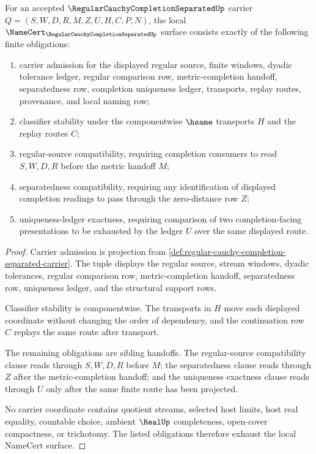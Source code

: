 \begin{theorem}
\label{thm:regular-cauchy-completion-separated-namecert-obligations}
For an accepted $\RegularCauchyCompletionSeparatedUp$ carrier $Q=(S,W,D,R,M,Z,U,H,C,P,N)$, the local $\NameCert_{\RegularCauchyCompletionSeparatedUp}$ surface consists exactly of the following finite obligations:
\begin{enumerate}
\item carrier admission for the displayed regular source, finite windows, dyadic tolerance ledger, regular comparison row, metric-completion handoff, separatedness row, completion uniqueness ledger, transports, replay routes, provenance, and local naming row;
\item classifier stability under the componentwise $\hsame$ transports $H$ and the replay routes $C$;
\item regular-source compatibility, requiring completion consumers to read $S,W,D,R$ before the metric handoff $M$;
\item separatedness compatibility, requiring any identification of displayed completion readings to pass through the zero-distance row $Z$;
\item uniqueness-ledger exactness, requiring comparison of two completion-facing presentations to be exhausted by the ledger $U$ over the same displayed route.
\end{enumerate}
\end{theorem}
\begin{proof}
Carrier admission is projection from \autoref{def:regular-cauchy-completion-separated-carrier}. The tuple displays the regular source, stream windows, dyadic tolerances, regular comparison row, metric-completion handoff, separatedness row, uniqueness ledger, and the structural support rows.

Classifier stability is componentwise. The transports in $H$ move each displayed coordinate without changing the order of dependency, and the continuation row $C$ replays the same route after transport.

The remaining obligations are sibling handoffs. The regular-source compatibility clause reads through $S,W,D,R$ before $M$; the separatedness clause reads through $Z$ after the metric-completion handoff; and the uniqueness exactness clause reads through $U$ only after the same finite route has been projected.

No carrier coordinate contains quotient streams, selected host limits, host real equality, countable choice, ambient $\RealUp$ completeness, open-cover compactness, or trichotomy. The listed obligations therefore exhaust the local NameCert surface.
\end{proof}

